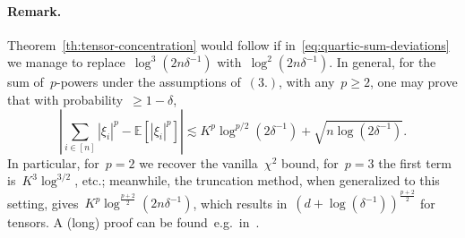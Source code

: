 \documentclass[11pt]{article}
\newcommand{\E}{\mathds{E}}
\newcommand{\cN}{\mathcal{N}}
\newcommand{\veps}{\varepsilon}
\newcommand{\lsim}{\lesssim}
\newcommand{\leqs}{\leqslant}
\newcommand{\geqs}{\geqslant}
\renewcommand{\le}{\leqs}
\renewcommand{\ge}{\geqs}
\begin{document}
\paragraph{Remark.}
Theorem~\ref{th:tensor-concentration} would follow if in~\eqref{eq:quartic-sum-deviations} we manage to replace~$\log^3(2n\delta^{-1})$ with~$\log^2(2n\delta^{-1})$. 
In general, for the sum of~$p$-powers under the assumptions of~$(3.)$, with any~$p \ge 2$, one may prove that with probability~$\ge 1-\delta$,
\begin{equation}
\label{eq:power-sum-deviations}
\left| \textstyle\sum_{i \in [n]} |\xi_i|^p - \E[|\xi_i|^p] \right| 
\lsim 
K^p \log^{p/2}(2\delta^{-1}) + \sqrt{n\log(2\delta^{-1})}.
\end{equation}
In particular, for~$p = 2$ we recover the vanilla~$\chi^2$ bound, for~$p = 3$ the first term is~$K^3 \log^{3/2}$, etc.;
meanwhile, the truncation method, when generalized to this setting, gives~$K^p\log^{\frac{p+2}{2}}(2n\delta^{-1})$, which results in~$(d+\log(\delta^{-1}))^{\frac{p+2}{2}}$ for tensors.
A (long) proof can be found~e.g.~in~\cite[Thm.~3.1]{hao2019bootstrapping}. 


\end{document}
